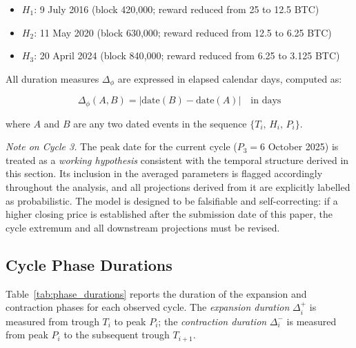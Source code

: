 \begin{itemize}
  \item $H_1$: 9 July 2016 (block 420{,}000; reward reduced from 25 to 12.5 BTC)
  \item $H_2$: 11 May 2020 (block 630{,}000; reward reduced from 12.5 to 6.25 BTC)
  \item $H_3$: 20 April 2024 (block 840{,}000; reward reduced from 6.25 to 3.125 BTC)
\end{itemize}

All duration measures $\Delta_{\phi}$ are expressed in elapsed calendar days,
computed as:

\begin{equation}
  \Delta_{\phi}(A, B) = \lvert \text{date}(B) - \text{date}(A) \rvert
  \quad \text{in days}
\end{equation}

where $A$ and $B$ are any two dated events in the sequence
$\{T_i,\, H_i,\, P_i\}$.

\medskip
\noindent\textit{Note on Cycle 3.} The peak date for the current cycle
($P_3 = 6$ October 2025) is treated as a \textit{working hypothesis} consistent
with the temporal structure derived in this section. Its inclusion in the
averaged parameters is flagged accordingly throughout the analysis, and all
projections derived from it are explicitly labelled as probabilistic. The model
is designed to be falsifiable and self-correcting: if a higher closing price is
established after the submission date of this paper, the cycle extremum and all
downstream projections must be revised.

\subsection{Cycle Phase Durations}

Table~\ref{tab:phase_durations} reports the duration of the expansion and
contraction phases for each observed cycle. The \textit{expansion duration}
$\Delta^{+}_i$ is measured from trough $T_i$ to peak $P_i$; the
\textit{contraction duration} $\Delta^{-}_i$ is measured from peak $P_i$ to
the subsequent trough $T_{i+1}$.

